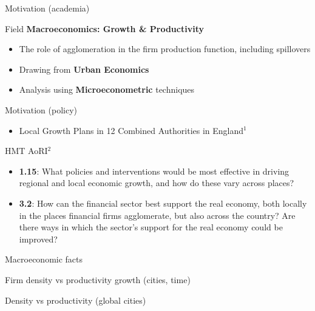 \documentclass[aspectratio=169]{beamer}
\begin{document}
\begin{frame}{Motivation (academia)}
    \begin{block}{Field}
        \textbf{Macroeconomics: Growth \& Productivity}
        \begin{itemize}
            \item The role of agglomeration in the firm production function, including spillovers
            \item Drawing from \textbf{Urban Economics}
            \item Analysis using \textbf{Microeconometric} techniques
        \end{itemize}
    \end{block}
\end{frame}

\begin{frame}{Motivation (policy)}
    \begin{itemize}
        \item Local Growth Plans in 12 Combined Authorities in England$^1$
    \end{itemize}
    \begin{block}{HMT AoRI$^2$}
        \begin{itemize}
            \item \textbf{1.15}: What policies and interventions would be most effective in driving regional and local economic growth, and how do these vary across places?
            \item \textbf{3.2}: How can the financial sector best support the real economy, both locally in the places financial firms agglomerate, but also across the country?
					Are there ways in which the sector’s support for the real economy could be improved?
        \end{itemize}
    \end{block}
\end{frame}

\begin{frame}{Macroeconomic facts}
    \begin{block}{Firm density vs productivity growth (cities, time)}
    
    \end{block}
    \begin{block}{Density vs productivity (global cities)}
    
    \end{block}
\end{frame}
\end{document}
